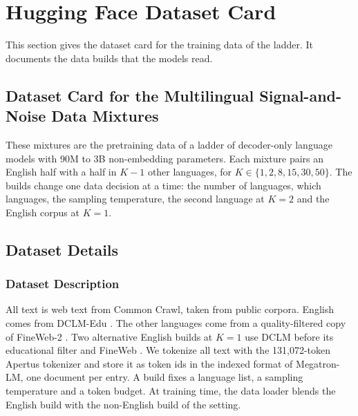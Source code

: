 \clearpage
\section{Hugging Face Dataset Card}
\label{app:hf_dataset_card}

This section gives the dataset card for the training data of the ladder. It documents the data builds that the models read.


\subsection*{Dataset Card for the Multilingual Signal-and-Noise Data Mixtures}

These mixtures are the pretraining data of a ladder of decoder-only language models with 90M to 3B non-embedding parameters. Each mixture pairs an English half with a half in $K-1$ other languages, for $K \in \{1, 2, 8, 15, 30, 50\}$. The builds change one data decision at a time: the number of languages, which languages, the sampling temperature, the second language at $K=2$ and the English corpus at $K=1$.

\subsection*{Dataset Details}

\subsubsection*{Dataset Description}

All text is web text from Common Crawl, taken from public corpora. English comes from DCLM-Edu \citep{allal_smollm2_2025}. The other languages come from a quality-filtered copy of FineWeb-2 \citep{penedo_fineweb2_2025,messmer_enhancing_2026}. Two alternative English builds at $K=1$ use DCLM before its educational filter \citep{li_datacomp-lm_2025} and FineWeb \citep{penedo_fineweb_2024}. We tokenize all text with the 131,072-token Apertus tokenizer and store it as token ids in the indexed format of Megatron-LM, one document per entry. A build fixes a language list, a sampling temperature and a token budget. At training time, the data loader blends the English build with the non-English build of the setting.

